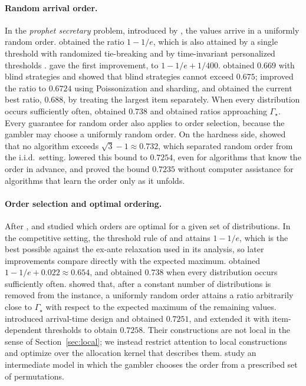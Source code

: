 \documentclass[11pt]{article}
\theoremstyle{definition}
\theoremstyle{remark}
\begin{document}
\paragraph{Random arrival order.}
In the \emph{prophet secretary} problem, introduced by \citet{EHLM17}, the values arrive in a
uniformly random order. \citet{EHLM17} obtained the ratio $1-1/e$, which is also attained by a
single threshold with randomized tie-breaking \citep{EHKS18} and by time-invariant
personalized thresholds \citep{CFHOV21}. \citet{ACK18} gave the first improvement, to
$1-1/e+1/400$. \citet{CSZ21} obtained $0.669$ with blind strategies and showed that blind
strategies cannot exceed $0.675$; \citet{Harb25} improved the ratio to $0.6724$ using
Poissonization and sharding, and \citet{CHLT25} obtained the current best ratio, $0.688$, by
treating the largest item separately. When every distribution occurs sufficiently often,
\citet{AEEHKL17} obtained $0.738$ and \citet{LPPSS21} obtained ratios approaching
$\Gamma_\star$. Every guarantee for random order also
applies to order selection, because the gambler may choose a uniformly random order. On the
hardness side, \citet{CSZ21} showed that no algorithm exceeds $\sqrt3-1\approx0.732$, which
separated random order from the i.i.d.\ setting. \citet{BC} lowered this bound to $0.7254$,
even for algorithms that know the order in advance, and \citet{GMS23} proved the bound $0.7235$
without computer assistance for algorithms that learn the order only as it unfolds.

\paragraph{Order selection and optimal ordering.}
After \citet{Hill83}, \citet{HH85} and \citet{Gilat87} studied which orders are optimal for a
given set of distributions. In the competitive setting, the threshold rule of \citet{CHMS10}
and \citet{Yan11} attains $1-1/e$, which is the best possible against the ex-ante relaxation
used in its analysis, so later improvements compare directly with the expected maximum.
\citet{BGLPS21} obtained $1-1/e+0.022\approx0.654$, and \citet{AEEHKL17} obtained $0.738$
when every distribution occurs sufficiently often. \citet{LPPSS21} showed that, after a
constant number of distributions is removed from the instance, a uniformly random order
attains a ratio arbitrarily close to $\Gamma_\star$ with respect to the expected maximum of the
remaining values. \citet{PT} introduced arrival-time design and obtained $0.7251$, and
\citet{BC} extended it with item-dependent thresholds to obtain $0.7258$. Their constructions
are not local in the sense of Section~\ref{sec:local}; we instead restrict attention to local
constructions and optimize over the allocation kernel that describes them. \citet{ADK21}
study an intermediate model in which the gambler chooses the order from a prescribed set of
permutations.
\end{document}
